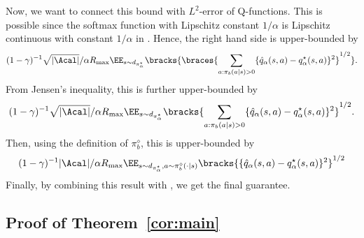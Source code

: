 Now, we want to connect this bound with $L^2$-error of Q-functions. This is possible since the softmax function with Lipschitz constant $1/\alpha$ is Lipschitz continuous with constant $1/\alpha$ in \citet[Proposition 4]{gao2017properties}. Hence,  the right hand side is upper-bounded by 
\begin{align*}
(1-\gamma)^{-1}\sqrt{|\Acal|}/\alpha R_{\max} \EE_{s \sim d_{\pi^{\star}_{\alpha}}}\bracks{\braces{\sum_{a: \pi_b(a \mid s)>0}\{\hat q_{\alpha}(s,a)-q^{\star}_{\alpha}(s,a)\}^2}^{1/2} }. 
\end{align*}
From Jensen's inequality, this is further upper-bounded by 
\begin{align*}
  (1-\gamma)^{-1}\sqrt{|\Acal|}/\alpha R_{\max} \EE_{s \sim d_{\pi^{\star}_{\alpha}}}\bracks{\sum_{a: \pi_b(a \mid s)>0}\{\hat q_{\alpha}(s,a)-q^{\star}_{\alpha}(s,a)\}^2}^{1/2}.  
\end{align*}
Then, using the definition of $\pi^{\diamond}_b$, this is upper-bounded by 
\begin{align*}
 (1-\gamma)^{-1}|\Acal|/\alpha R_{\max} \EE_{s \sim d_{\pi^{\star}_{\alpha}},a\sim \pi^{\diamond}_b(\cdot \mid s)}\bracks{\{\hat q_{\alpha}(s,a)-q^{\star}_{\alpha}(s,a)\}^2}^{1/2} 
\end{align*}
Finally, by combining this result with , we get the final guarantee. 


\subsection{Proof of Theorem~\ref{cor:main}}


